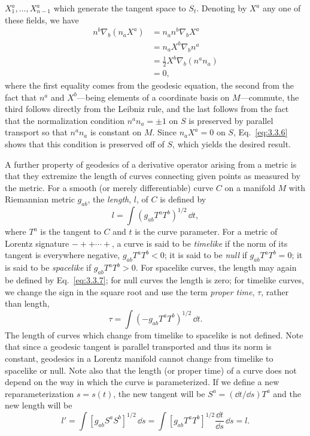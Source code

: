 $X^a_1,\ldots,X^a_{n-1}$ which generate the tangent space to $S_t$. Denoting by $X^a$ any one of
these fields, we have
\begin{equation}
  \begin{aligned}
    n^b\nabla_b(n_aX^a)
    &=n_an^b\nabla_bX^a\\
    &=n_aX^b\nabla_bn^a\\
    &=\frac{1}{2}X^b\nabla_b(n^an_a)\\
    &=0,
  \end{aligned}
  \tag{3.3.6}\label{eq:3.3.6}
\end{equation}
where the first equality comes from the geodesic equation, the second from the fact
that $n^a$ and $X^b$---being elements of a coordinate basis on $M$---commute, the third
follows directly from the Leibniz rule, and the last follows from the fact that the
normalization condition $n^an_a=\pm1$ on $S$ is preserved by parallel transport so that
$n^an_a$ is constant on $M$. Since $n_aX^a=0$ on $S$, Eq.~\eqref{eq:3.3.6} shows that this
condition is preserved off of $S$, which yields the desired result.

A further property of geodesics of a derivative operator arising from a metric is
that they extremize the length of curves connecting given points as measured by the
metric. For a smooth (or merely differentiable) curve $C$ on a manifold $M$ with
Riemannian metric $g_{ab}$, the \emph{length}, $l$, of $C$ is defined by
\begin{equation}
  l=\int(g_{ab}T^aT^b)^{1/2}\,\dd t,
  \tag{3.3.7}\label{eq:3.3.7}
\end{equation}
where $T^a$ is the tangent to $C$ and $t$ is the curve parameter. For a metric of Lorentz
signature $-++\cdots+$, a curve is said to be \emph{timelike} if the norm of its tangent is
everywhere negative, $g_{ab}T^aT^b<0$; it is said to be \emph{null} if $g_{ab}T^aT^b=0$; it is said to
be \emph{spacelike} if $g_{ab}T^aT^b>0$. For spacelike curves, the length may again be defined
by Eq.~\eqref{eq:3.3.7}; for null curves the length is zero; for timelike curves, we change
the sign in the square root and use the term \emph{proper time}, $\tau$, rather than length,
\begin{equation}
  \tau=\int(-g_{ab}T^aT^b)^{1/2}\,\dd t.
  \tag{3.3.8}\label{eq:3.3.8}
\end{equation}
The length of curves which change from timelike to spacelike is not defined. Note
that since a geodesic tangent is parallel transported and thus its norm is constant,
geodesics in a Lorentz manifold cannot change from timelike to spacelike or null.
Note also that the length (or proper time) of a curve does not depend on the way in
which the curve is parameterized. If we define a new reparameterization $s=s(t)$, the
new tangent will be $S^a=(\dd t/\dd s)T^a$ and the new length will be
\begin{equation}
  l'=\int[g_{ab}S^aS^b]^{1/2}\,\dd s
  =\int[g_{ab}T^aT^b]^{1/2}\frac{\dd t}{\dd s}\,\dd s=l.
  \tag{3.3.9}\label{eq:3.3.9}
\end{equation}


